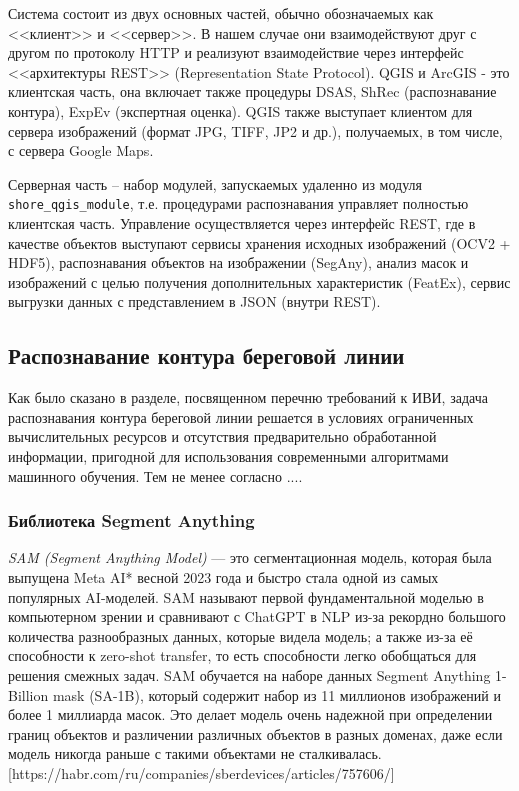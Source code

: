 \documentclass[732,14pt,final]{studrep}
\begin{document}
Система состоит из двух основных частей, обычно обозначаемых как <<клиент>> и <<сервер>>. В нашем случае они взаимодействуют друг с другом по протоколу HTTP и реализуют взаимодействие через интерфейс <<архитектуры REST>> (Representation State Protocol). QGIS и ArcGIS - это клиентская часть, она включает также процедуры DSAS, ShRec (распознавание контура), ExpEv (экспертная оценка). QGIS также выступает клиентом для сервера изображений (формат JPG, TIFF, JP2 и др.), получаемых, в том числе, с сервера Google Maps.

Серверная часть -- набор модулей, запускаемых удаленно из модуля \verb|shore_qgis_module|, т.е. процедурами распознавания управляет полностью   клиентская часть. Управление осуществляется через интерфейс REST, где в качестве объектов выступают сервисы хранения исходных изображений (OCV2 + HDF5), распознавания объектов на изображении (SegAny), анализ масок и изображений с целью получения дополнительных характеристик (FeatEx), сервис выгрузки данных с представлением в JSON (внутри REST).

\subsection{Распознавание контура береговой линии}

Как было сказано в разделе, посвященном перечню требований к ИВИ, задача распознавания контура береговой линии решается в условиях ограниченных вычислительных ресурсов и отсутствия предварительно обработанной информации, пригодной для использования современными алгоритмами машинного обучения. Тем не менее согласно ....

\subsubsection{Библиотека Segment Anything}
\label{sec:sam}

\emph{SAM (Segment Anything Model)} — это сегментационная модель, которая была выпущена Meta AI*  весной 2023 года и быстро стала одной из самых популярных AI-моделей. SAM называют первой фундаментальной моделью в компьютерном зрении и сравнивают с ChatGPT в NLP из-за рекордно большого количества разнообразных данных, которые видела модель; а также из-за её способности к zero-shot transfer, то есть способности легко обобщаться для решения смежных задач.
SAM обучается на наборе данных Segment Anything 1-Billion mask (SA-1B), который содержит набор из 11 миллионов изображений и более 1 миллиарда масок. Это делает модель очень надежной при определении границ объектов и различении различных объектов в разных доменах, даже если модель никогда раньше с такими объектами не сталкивалась.  [https://habr.com/ru/companies/sberdevices/articles/757606/]
\end{document}
